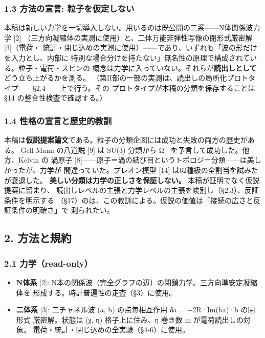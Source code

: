 \documentclass[
]{ltjarticle}
\providecommand{\tightlist}{%
  \setlength{\itemsep}{0pt}\setlength{\parskip}{0pt}}
\begin{document}
\subsubsection{1.3 方法の宣言:
粒子を仮定しない}\label{ux65b9ux6cd5ux306eux5ba3ux8a00-ux7c92ux5b50ux3092ux4eeeux5b9aux3057ux306aux3044}

本稿は新しい力学を一切導入しない。用いるのは既公開の二系------N体関係波力学
{[}2{]} （三方向凝縮体の実測に使用）と、二体万能非弾性写像の閉形式厳密解
{[}3{]}（電荷・
統計・閉じ込めの実測に使用）------であり、いずれも「波の形だけを入力とし、内部に
特別な場合分けを持たない」無名性の原理で構成されている。粒子・電荷・スピンの
概念は力学に入っていない。それらが\textbf{読出しとして}どう立ち上がるかを測る。
（第II部の一部の実測は、読出しの局所化プロトタイプ------§2.4------上で行う。その
プロトタイプが本稿の分類を保存することは §14 の整合性検査で確認する。）

\subsubsection{1.4
性格の宣言と歴史的教訓}\label{ux6027ux683cux306eux5ba3ux8a00ux3068ux6b74ux53f2ux7684ux6559ux8a13}

本稿は\textbf{仮説提案論文}である。粒子の分類企図には成功と失敗の両方の歴史がある。
Gell-Mann の八道説 {[}9{]} は SU(3) 分類から Ω\(^{-}\)
を予言して成功した。他方、Kelvin の 渦原子
{[}8{]}------原子＝渦の結び目というトポロジー分類------は美しかったが、力学が
間違っていた。プレオン模型 {[}14{]} は62種級の全割当を試みたが衰退した。
\textbf{美しい分類は力学の正しさを保証しない。}
本稿が証明でなく仮説提案に留まり、
読出しレベルの主張と力学レベルの主張を峻別し（§2.3）、反証条件を明示する
（§17）のは、この教訓による。仮説の価値は「接続の広さと反証条件の明確さ」で
測られたい。

\subsection{2. 方法と規約}\label{ux65b9ux6cd5ux3068ux898fux7d04}

\subsubsection{2.1 力学（read-only）}\label{ux529bux5b66read-only}

\begin{itemize}
\tightlist
\item
  \textbf{N体系} {[}2{]}:
  N本の関係波（完全グラフの辺）の閉鎖力学。三方向準安定凝縮体を
  形成する。時計普遍性の走査（§3）に使用。
\item
  \textbf{二体系} {[}3{]}: 二チャネル波 (a, b) の点毎相互作用 δa =
  −2R·Im(b̄a)·b の閉形式 厳密解。状態は (χ, η) 格子上に住み、η 巻き数 m
  が電荷読出しの対象。 電荷・統計・閉じ込めの全実験（§4-6）に使用。
\end{itemize}
\end{document}
